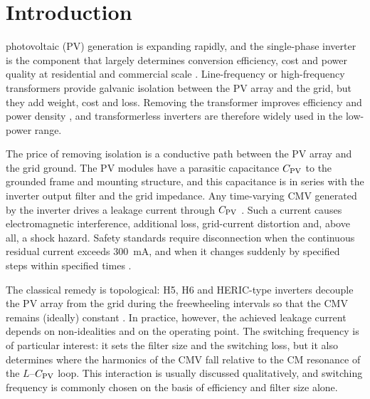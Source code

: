 \section{Introduction}
\label{sec:intro}
 photovoltaic (PV) generation is expanding rapidly, and the single-phase inverter is the component that largely determines conversion efficiency, cost and power quality at residential and commercial scale \cite{Kjaer2005}. Line-frequency or high-frequency transformers provide galvanic isolation between the PV array and the grid, but they add weight, cost and loss. Removing the transformer improves efficiency and power density \cite{Gonzalez2007,Araujo2010}, and transformerless inverters are therefore widely used in the low-power range.

The price of removing isolation is a conductive path between the PV array and the grid ground. The PV modules have a parasitic capacitance $C_{\mathrm{PV}}$ to the grounded frame and mounting structure, and this capacitance is in series with the inverter output filter and the grid impedance. Any time-varying CMV generated by the inverter drives a leakage current through $C_{\mathrm{PV}}$ \cite{Gubia2007,Lopez2007}. Such a current causes electromagnetic interference, additional loss, grid-current distortion and, above all, a shock hazard. Safety standards require disconnection when the continuous residual current exceeds 300~mA, and when it changes suddenly by specified steps within specified times \cite{VDE0126,IEC62109}.

The classical remedy is topological: H5, H6 and HERIC-type inverters decouple the PV array from the grid during the freewheeling intervals so that the CMV remains (ideally) constant \cite{Victor2008,Schmidt2003,Zhang2014,Kerekes2011}. In practice, however, the achieved leakage current depends on non-idealities and on the operating point. The switching frequency is of particular interest: it sets the filter size and the switching loss, but it also determines where the harmonics of the CMV fall relative to the CM resonance of the $L$--$C_{\mathrm{PV}}$ loop. This interaction is usually discussed qualitatively, and switching frequency is commonly chosen on the basis of efficiency and filter size alone.

